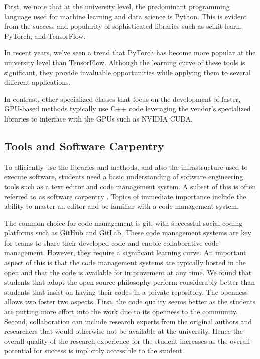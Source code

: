 \documentclass[utf8]{FrontiersinVancouver} %
\begin{document}
First, we note that at the university level, the predominant programming language
used for machine learning and data science is Python. This is
evident from the success and popularity of sophisticated libraries such as
scikit-learn, PyTorch, and TensorFlow.

In recent years, we've seen a trend that PyTorch has become more popular at
the university level than TensorFlow.  Although the learning curve of
these tools is significant, they provide invaluable opportunities
while applying them to several different applications.

In contrast, other specialized classes that focus on the development
of faster, GPU-based methods typically use C++ code leveraging the
vendor's specialized libraries to interface with the GPUs such as
NVIDIA CUDA.

\subsection{Tools and Software Carpentry}\label{sec:tools}


To efficiently use the libraries and methods, and also the
infrastructure used to execute software, students need a basic understanding of software engineering
tools such as a text editor and code management system.
A subset of this is often
referred to as software carpentry \cite{software-carpentry}. Topics of immediate importance
include the ability to master an editor and be familiar with a code
management system.

The common choice for code management is git, with successful social coding
platforms such as GitHub and GitLab.  These code management systems are key
for teams to share their developed code and enable collaborative code management.
However, they require a significant learning curve. An important aspect of this is that the
code management systems are typically hosted in the open and that the
code is available for improvement at any time. We found that students
that adopt the open-source philosophy perform considerably better than
students that insist on having their codes in a private
repository. The openness allows two foster two aspects. First, the
code quality seems better as the students are putting more effort into
the work due to its openness to the community. Second, collaboration
can include research experts from the original authors and researchers
that would otherwise not be available at the university. Hence the
overall quality of the research experience for the student increases
as the overall potential for success is implicitly accessible to the
student.
\end{document}
